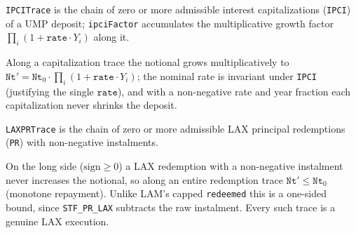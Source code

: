 \begin{definition}\label{def:ipcitrace}
        \leanok
        \texttt{IPCITrace} is the chain of zero or more admissible interest
        capitalizations (\texttt{IPCI}) of a UMP deposit; \texttt{ipciFactor}
        accumulates the multiplicative growth factor
        $\prod_i (1 + \mathtt{rate}\cdot Y_i)$ along it.
\end{definition}

\begin{theorem}\label{thm:ump-growth}
        \leanok
        Along a capitalization trace the notional grows multiplicatively to
        $\mathtt{Nt}' = \mathtt{Nt}_0 \cdot \prod_i (1 + \mathtt{rate}\cdot Y_i)$;
        the nominal rate is invariant under \texttt{IPCI} (justifying the single
        $\mathtt{rate}$), and with a non-negative rate and year fraction each
        capitalization never shrinks the deposit.
\end{theorem}

\begin{definition}\label{def:laxprtrace}
        \leanok
        \texttt{LAXPRTrace} is the chain of zero or more admissible LAX principal
        redemptions (\texttt{PR}) with non-negative instalments.
\end{definition}

\begin{theorem}\label{thm:lax-amort}
        \leanok
        On the long side ($\mathrm{sign} \ge 0$) a LAX redemption with a
        non-negative instalment never increases the notional, so along an entire
        redemption trace $\mathtt{Nt}' \le \mathtt{Nt}_0$ (monotone repayment).
        Unlike LAM's capped \texttt{redeemed} this is a one-sided bound, since
        \texttt{STF\_PR\_LAX} subtracts the raw instalment.  Every such trace is a
        genuine LAX execution.
\end{theorem}

